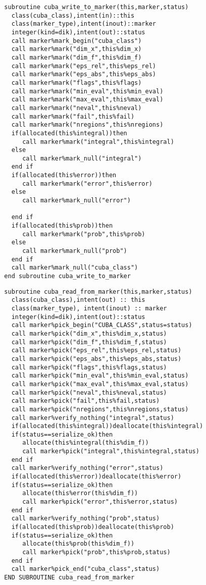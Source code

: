 \begin{Verbatim}
  subroutine cuba_write_to_marker(this,marker,status)
    class(cuba_class),intent(in)::this
    class(marker_type),intent(inout)::marker
    integer(kind=dik),intent(out)::status
    call marker%mark_begin("cuba_class")
    call marker%mark("dim_x",this%dim_x)
    call marker%mark("dim_f",this%dim_f)    
    call marker%mark("eps_rel",this%eps_rel)
    call marker%mark("eps_abs",this%eps_abs)
    call marker%mark("flags",this%flags)    
    call marker%mark("min_eval",this%min_eval)
    call marker%mark("max_eval",this%max_eval)
    call marker%mark("neval",this%neval)
    call marker%mark("fail",this%fail)
    call marker%mark("nregions",this%nregions)
    if(allocated(this%integral))then
       call marker%mark("integral",this%integral)
    else
       call marker%mark_null("integral")
    end if
    if(allocated(this%error))then
       call marker%mark("error",this%error)
    else
       call marker%mark_null("error")

    end if
    if(allocated(this%prob))then
       call marker%mark("prob",this%prob)
    else
       call marker%mark_null("prob")
    end if    
    call marker%mark_null("cuba_class")
  end subroutine cuba_write_to_marker
\end{Verbatim}

\begin{Verbatim}
  subroutine cuba_read_from_marker(this,marker,status)
    class(cuba_class),intent(out) :: this
    class(marker_type), intent(inout) :: marker
    integer(kind=dik),intent(out)::status
    call marker%pick_begin("CUBA_CLASS",status=status)
    call marker%pick("dim_x",this%dim_x,status)
    call marker%pick("dim_f",this%dim_f,status)
    call marker%pick("eps_rel",this%eps_rel,status)
    call marker%pick("eps_abs",this%eps_abs,status)
    call marker%pick("flags",this%flags,status)
    call marker%pick("min_eval",this%min_eval,status)
    call marker%pick("max_eval",this%max_eval,status)
    call marker%pick("neval",this%neval,status)
    call marker%pick("fail",this%fail,status)
    call marker%pick("nregions",this%nregions,status)
    call marker%verify_nothing("integral",status)
    if(allocated(this%integral))deallocate(this%integral)
    if(status==serialize_ok)then
       allocate(this%integral(this%dim_f))
       call marker%pick("integral",this%integral,status)
    end if
    call marker%verify_nothing("error",status)
    if(allocated(this%error))deallocate(this%error)
    if(status==serialize_ok)then
       allocate(this%error(this%dim_f))
       call marker%pick("error",this%error,status)
    end if
    call marker%verify_nothing("prob",status)
    if(allocated(this%prob))deallocate(this%prob)
    if(status==serialize_ok)then
       allocate(this%prob(this%dim_f))
       call marker%pick("prob",this%prob,status)
    end if
    call marker%pick_end("cuba_class",status)
  END SUBROUTINE cuba_read_from_marker
\end{Verbatim}

